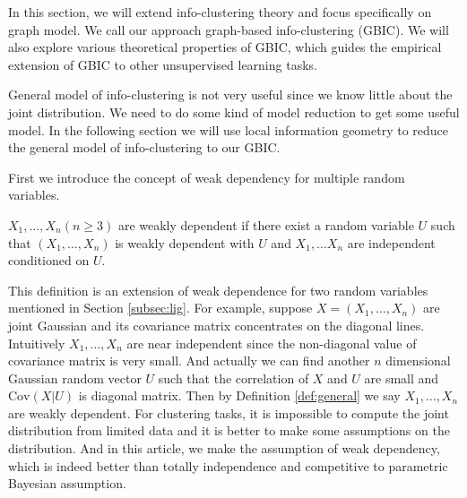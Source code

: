In this section, we will extend info-clustering theory and focus specifically on graph model. We call our approach graph-based info-clustering (GBIC).
We will also explore various theoretical
properties of GBIC, which guides the empirical extension of GBIC to other unsupervised learning tasks.

General model of info-clustering is not very useful since we know little about the joint distribution.
We need to do some kind of model reduction to get some useful model. 
In the following section we will use local information geometry to reduce the general model of info-clustering to our GBIC.



First we introduce the concept of weak dependency for multiple random variables.

\begin{definition}\label{def:general}
$X_1, \dots, X_n (n\geq 3)$ are weakly dependent if there exist a random variable $U$ such that
$(X_1, \dots, X_n)$ is weakly dependent with $U$ and $X_1, \dots X_n$ are independent conditioned
on $U$.
\end{definition}

This definition is an extension of weak dependence for two random variables mentioned in Section \ref{subsec:lig}.
For example, suppose $X=(X_1, \dots, X_n)$ are joint Gaussian and its covariance matrix concentrates on the diagonal lines.
Intuitively $X_1, \dots, X_n$ are near independent since the non-diagonal value of covariance matrix is very small. 
And actually we can find another $n$ dimensional Gaussian random vector $U$ such that the correlation of $X$ and $U$ are small
and $\mathrm{Cov}(X|U)$ is diagonal matrix. Then by Definition \ref{def:general} we say $X_1, \dots, X_n$ are weakly dependent.
For clustering tasks, it is impossible to compute the joint distribution from limited data and it is better to make some
assumptions on the distribution. And in this article, we make the assumption of weak dependency, which is indeed better than totally
independence and competitive to parametric Bayesian assumption.

